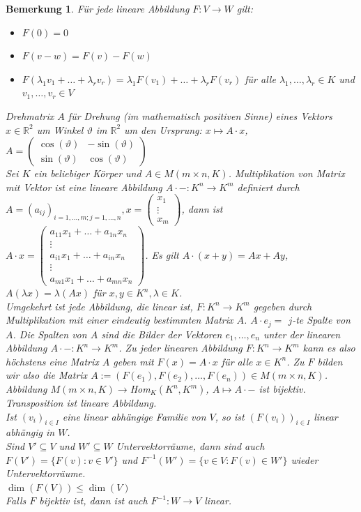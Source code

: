 \documentclass[12pt,a4paper]{article}
\theoremstyle{plain}
\newtheorem{Bemerkung}[Theorem]{Bemerkung}
\newcommand{\R}{\mathbb{R}}
\numberwithin{equation}{section}
\begin{document}
\begin{Bemerkung}
Für jede lineare Abbildung $F:V \rightarrow W$ gilt: 
\begin{itemize}
\item $F(0)=0$
\item $F(v-w)=F(v)-F(w)$
\item $F(\lambda_1 v_1+\ldots + \lambda_r v_r )=\lambda_1 F(v_1)+\ldots+\lambda_r F(v_r)$ für alle $\lambda_1,\ldots,\lambda_r \in K$ und $v_1,\ldots, v_r\in V$
\end{itemize}
Drehmatrix $A$ für Drehung (im mathematisch positiven Sinne) eines Vektors $x\in \R^2$ um Winkel $\vartheta$ im $\R^2$ um den Ursprung: $x \mapsto A\cdot x$, $A=\left(\begin{matrix} \cos(\vartheta) & -\sin(\vartheta) \\ \sin(\vartheta) & \cos(\vartheta) \end{matrix}\right)$ \\
Sei $K$ ein beliebiger Körper und $A\in M(m\times n, K)$. Multiplikation von Matrix mit Vektor ist eine lineare Abbildung $A\cdot - : K^n\rightarrow K^m$ definiert durch $A=(a_{ij})_{i=1,\ldots,m; j=1,\ldots,n}, x=\left(\begin{array}{c}x_1 \\ \vdots \\ x_m\end{array} \right)$, dann ist $A\cdot x=\left(\begin{array}{c} a_{11}x_1+\ldots+a_{1n}x_n \\ \vdots \\a_{i1}x_1+\ldots+a_{in}x_n\\ \vdots \\ a_{m1}x_1+\ldots+a_{mn}x_n \end{array} \right)$. Es gilt $A\cdot (x+y)=Ax+Ay$, $A(\lambda x)=\lambda (Ax)$ für $x,y\in K^n, \lambda \in K$. \\
Umgekehrt ist jede Abbildung, die linear ist, $F: K^n \rightarrow K^m$ gegeben durch Multiplikation mit einer eindeutig bestimmten Matrix $A$. $A\cdot e_j=$ $j$-te Spalte von $A$. Die Spalten von $A$ sind die Bilder der Vektoren $e_1,\ldots,e_n$ unter der linearen Abbildung $A\cdot - :K^n \rightarrow K^m$. Zu jeder linearen Abbildung $F:K^n\rightarrow K^m$ kann es also höchstens eine Matrix $A$ geben mit $F(x)=A\cdot x$ für alle $x\in K^n$. Zu $F$ bilden wir also die Matrix $A:=(F(e_1),F(e_2),\ldots,F(e_n))\in M(m\times n, K)$. Abbildung $M(m\times n, K) \rightarrow $Hom$_K(K^n, K^m)$, $A\mapsto A\cdot - $ ist bijektiv.\\
Transposition ist lineare Abbildung.\\
Ist  $(v_i)_{i\in I}$ eine linear abhängige Familie von $V$, so ist $(F(v_i))_{i\in I}$ linear abhängig in $W$.\\
Sind $V' \subseteq V$ und $W'\subseteq W$ Untervektorräume, dann sind auch $F(V')=\{F(v):v\in V'\}$ und $F^{-1}(W')=\{v\in V:F(v)\in W'\}$ wieder Untervektorräume.\\
$\dim (F(V))\leq \dim (V)$ \\
Falls $F$ bijektiv ist, dann ist auch $F^{-1}: W\rightarrow V$ linear.
\end{Bemerkung}
\end{document}
